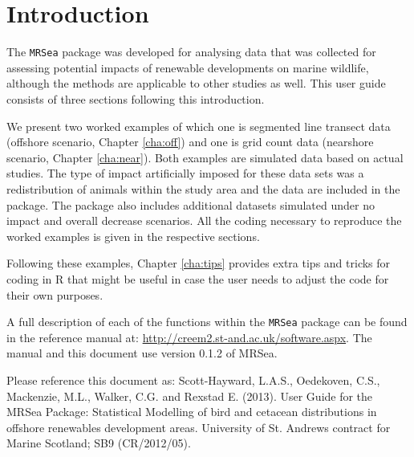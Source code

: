 \documentclass[11pt, a4paper]{report}
\begin{document}


\tableofcontents


\chapter{Introduction}
The {\tt MRSea} package was developed for analysing data that was collected for assessing potential impacts of renewable developments on marine wildlife, although the methods are applicable to other studies as well. This user guide consists of three sections following this introduction. 

\vspace{0.3cm}
We present two worked examples of which one is segmented line transect data (offshore scenario, Chapter \ref{cha:off}) and one is grid count data (nearshore scenario, Chapter \ref{cha:near}).  Both examples are simulated data based on actual studies. The type of impact artificially imposed for these data sets was a redistribution of animals within the study area and the data are included in the package. The package also includes additional datasets simulated under no impact and overall decrease scenarios. All the coding necessary to reproduce the worked examples is given in the respective sections. 

\vspace{0.3cm}
Following these examples, Chapter \ref{cha:tips} provides extra tips and tricks for coding in R that might be useful in case the user needs to adjust the code for their own purposes.

\vspace{0.3cm}
A full description of each of the functions within the {\tt MRSea} package can be found in the reference manual at: \href{http://creem2.st-and.ac.uk/software.aspx}{http://creem2.st-and.ac.uk/software.aspx}.  The manual and this document use version 0.1.2 of MRSea.

\vspace{0.3cm}
\begin{block}{Please reference this document as:}
\noindent Scott-Hayward, L.A.S., Oedekoven, C.S., Mackenzie, M.L., Walker, C.G. and Rexstad E. (2013). User Guide for the MRSea Package: Statistical Modelling of bird and cetacean distributions in offshore renewables development areas. University of St. Andrews contract for Marine Scotland; SB9 (CR/2012/05).
\end{block}

\newpage







\end{document}
